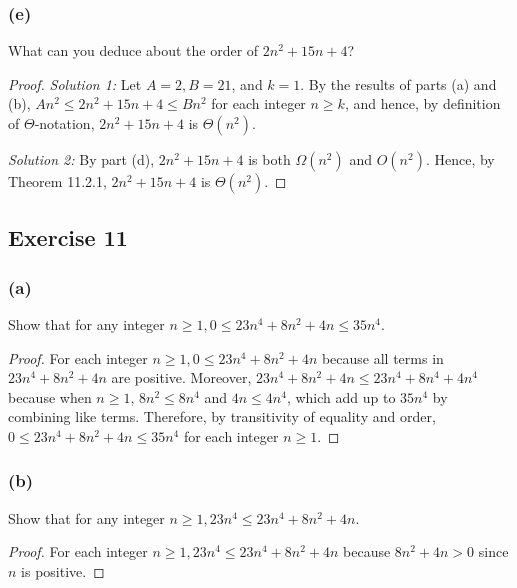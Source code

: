 \documentclass[14pt]{extarticle}
\begin{document}
\subsubsection{(e)}
What can you deduce about the order of \(2n^2 + 15n + 4\)?
\begin{proof}
{\it Solution 1:} Let \(A = 2, B = 21\), and \(k = 1\). By the results of parts (a) and (b), \(An^2 \leq 2n^2 + 15n + 4 \leq 
Bn^2\) for each integer \(n \geq k\), and hence, by definition of \(\Theta\)-notation, \(2n^2 + 15n + 4\) is \(\Theta(n^2)\).

{\it Solution 2:} By part (d), \(2n^2 + 15n + 4\) is both \(\Omega(n^2)\) and \(O(n^2)\). Hence, by Theorem 11.2.1, 
\(2n^2 + 15n + 4\) is \(\Theta(n^2)\).
\end{proof}

\subsection{Exercise 11}
\subsubsection{(a)}
Show that for any integer \(n \geq 1, 0 \leq 23n^4 + 8n^2 + 4n \leq 35n^4\).

\begin{proof}
For each integer \(n \geq 1, 0 \leq 23n^4 + 8n^2 + 4n\) because all terms in \(23n^4 + 8n^2 + 4n\) are positive. 
Moreover, \(23n^4 + 8n^2 + 4n \leq 23n^4 + 8n^4 + 4n^4\) because when \(n \geq 1\), \(8n^2 \leq 8n^4\) and 
\(4n \leq 4n^4\), which add up to \(35n^4\) by combining like terms. Therefore, by transitivity of equality and order, 
\(0 \leq 23n^4 + 8n^2 + 4n \leq 35n^4\) for each integer \(n \geq 1\).
\end{proof}

\subsubsection{(b)}
Show that for any integer \(n \geq 1, 23n^4 \leq 23n^4 + 8n^2 + 4n\).

\begin{proof}
For each integer \(n \geq 1, 23n^4 \leq 23n^4 + 8n^2 + 4n\) because \(8n^2 + 4n > 0\) since \(n\) is positive.
\end{proof}
\end{document}
